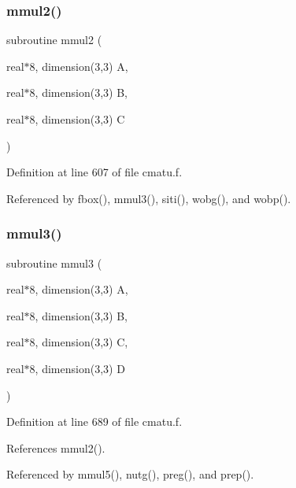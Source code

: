 \subsubsection{\texorpdfstring{mmul2()}{mmul2()}}
{\footnotesize\ttfamily subroutine mmul2 (\begin{DoxyParamCaption}\item[{real$\ast$8, dimension(3,3)}]{A,  }\item[{real$\ast$8, dimension(3,3)}]{B,  }\item[{real$\ast$8, dimension(3,3)}]{C }\end{DoxyParamCaption})}



Definition at line 607 of file cmatu.\+f.



Referenced by fbox(), mmul3(), siti(), wobg(), and wobp().

\mbox{\label{cmatu_8f_aac70d26c724db006ea31416b5d0a4309}} 
\subsubsection{\texorpdfstring{mmul3()}{mmul3()}}
{\footnotesize\ttfamily subroutine mmul3 (\begin{DoxyParamCaption}\item[{real$\ast$8, dimension(3,3)}]{A,  }\item[{real$\ast$8, dimension(3,3)}]{B,  }\item[{real$\ast$8, dimension(3,3)}]{C,  }\item[{real$\ast$8, dimension(3,3)}]{D }\end{DoxyParamCaption})}



Definition at line 689 of file cmatu.\+f.



References mmul2().



Referenced by mmul5(), nutg(), preg(), and prep().

\mbox{\label{cmatu_8f_a72bb4b183b3bc07c3f85a40d41b9c0ba}} 
